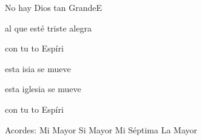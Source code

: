 \documentclass[12pt, spanish]{book}
\begin{document}
\begin{song}{No hay Dios tan Grande}{E}
\begin{SBOpGroup}
             al que esté triste alegra

            con tu to Espíri
        \end{SBOpGroup}

        \begin{SBOpGroup}
             esta isia se mueve 

             esta iglesia se mueve 

            con tu to Espíri
        \end{SBOpGroup}


        \ifChordBk
        \begin{SBOpGroup}
            Acordes:
            \upchord{\E}\qquad Mi Mayor \hfill
            \upchord{\B}\qquad Si Mayor \hfill\null\break
            \upchord{\Eseven}\qquad Mi S\'eptima \hfill
            \upchord{\A}\qquad La Mayor \hfill\null\break
        \end{SBOpGroup}
        \fi
    \end{song}
\end{document}
